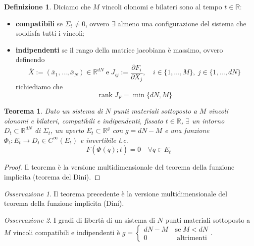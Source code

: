 \documentclass{book}
\theoremstyle{plain}
\newtheorem{teo}{Teorema}[chapter]
\theoremstyle{plain}
\theoremstyle{plain}
\theoremstyle{plain}
\theoremstyle{plain}
\theoremstyle{definition}
\newtheorem{defi}{Definizione}[chapter]
\theoremstyle{remark}
\newtheorem*{oss}{Osservazione}
\theoremstyle{definition}
\begin{document}
\begin{defi}
    Diciamo che $M$ vincoli olonomi e bilateri sono al tempo $t \in \mathbb{R}$:
    \begin{itemize}
        \item \textbf{compatibili} se $\Sigma_{t} \neq 0$, ovvero $\exists$ almeno una configurazione del sistema che soddisfa tutti i vincoli;
        \item \textbf{indipendenti} se il rango della matrice jacobiana è massimo, ovvero definendo
        \begin{displaymath}
            \overline{X}:=\left(\overline{x}_1, \ldots, \overline{x}_N\right) \in \mathbb{R}^{dN} \; \text{e} \; J_{ij}:=\frac{\partial F_{i}}{\partial X_{j}}, \quad i \in \{1,\ldots,M\}, \; j \in \{1,\ldots,dN\}
        \end{displaymath}
        richiediamo che
        \begin{displaymath}
            \operatorname{rank}J_{F}=\min \{dN, M\}
        \end{displaymath}
    \end{itemize}
\end{defi}

\begin{teo}
    Dato un sistema di $N$ punti materiali sottoposto a $M$ vincoli olonomi e bilateri, compatibili e indipendenti, fissato $t \in \mathbb{R}$, $\exists$ un intorno $D_t \subset \mathbb{R}^{dN}$ di $\Sigma_t$, un aperto $E_{t} \subset \mathbb{R}^{g}$ con $g=dN-M$ e una funzione $\Phi_t: E_{t} \to D_{t} \in C^{\infty}(E_t)$ e invertibile t.c.
    \begin{displaymath}
    \boxed{
        \overline{F}(\overline{\Phi}(\overline{q}); t)=\overline{0} \quad \forall\overline{q} \in E_t
        }
    \end{displaymath}
\end{teo}

\begin{proof}
    Il teorema è la versione multidimensionale del teorema della funzione implicita (teorema del Dini).
\end{proof}

\begin{oss}
    Il teorema precedente è la versione multidimensionale del teorema della funzione implicita (Dini).
\end{oss}

\begin{oss}
    I gradi di libertà di un sistema di $N$ punti materiali sottoposto a $M$ vincoli compatibili e indipendenti è $g=
    \begin{cases}
        dN - M \quad \text{se} \; M < dN \\ 0 \quad \quad \quad \quad \; \text{altrimenti}
    \end{cases}$.
\end{oss}
\end{document}

